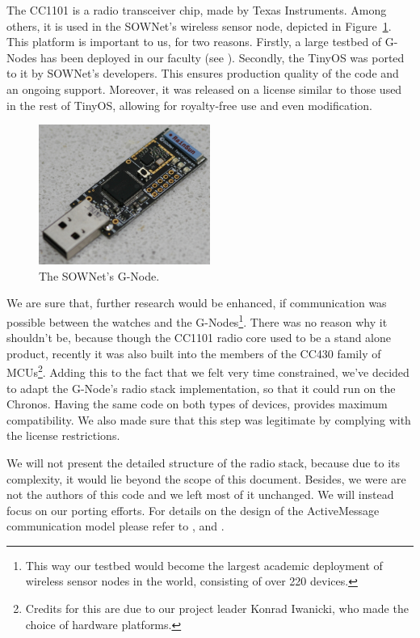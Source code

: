 The CC1101 is a radio transceiver chip, made by Texas Instruments. Among others, it is used in the SOWNet's \cite{G-Node} wireless sensor node, depicted in Figure~\ref{fig:gnode}. This platform is important to us, for two reasons. Firstly, a large testbed of G-Nodes has been deployed in our faculty (see \cite{MM}). Secondly, the TinyOS was ported to it by SOWNet's developers. This ensures production quality of the code and an ongoing support. Moreover, it was released on a license similar to those used in the rest of TinyOS, allowing for royalty-free use and even modification.
\begin{figure}[h]
  \centering
  \includegraphics[width=0.5\textwidth]{img/gnode.jpg}
  \caption{The SOWNet's G-Node.}
  \label{fig:gnode}
\end{figure}
We are sure that, further research would be enhanced, if communication was possible between the watches and the G-Nodes\footnote{This way our testbed would become the largest academic deployment of wireless sensor nodes in the world, consisting of over 220 devices.}. There was no reason why it shouldn't be, because though the CC1101 radio core used to be a stand alone product, recently it was also built into the members of the CC430 family of MCUs\footnote{Credits for this are due to our project leader Konrad Iwanicki, who made the choice of hardware platforms.}. Adding this to the fact that we felt very time constrained, we've decided to adapt the G-Node's radio stack implementation, so that it could run on the Chronos. Having the same code on both types of devices, provides maximum compatibility. We also made sure that this step was legitimate by complying with the license restrictions.

We will not present the detailed structure of the radio stack, because due to its complexity, it would lie beyond the scope of this document. Besides, we were are not the authors of this code and we left most of it unchanged. We will instead focus on our porting efforts. For details on the design of the ActiveMessage communication model please refer to \cite{BHC}, \cite{TEP116} and \cite{TEP126}.

